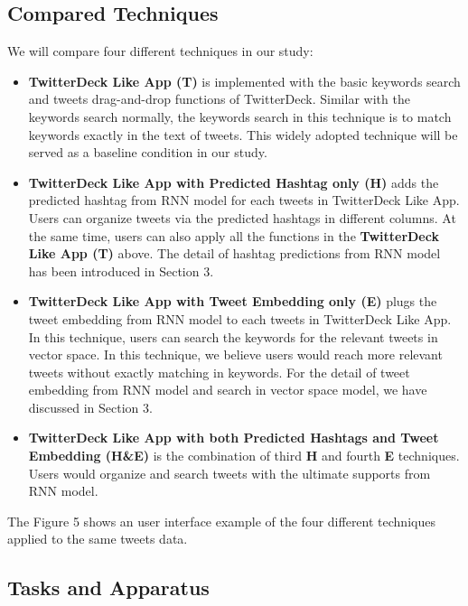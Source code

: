 \subsection{Compared Techniques}

We will compare four different techniques in our study:

\begin{itemize}
  \item \textbf{TwitterDeck Like App (T)} is implemented with the basic keywords search and tweets drag-and-drop functions of TwitterDeck. Similar with the keywords search normally, the keywords search in this technique is to match keywords exactly in the text of tweets. This widely adopted technique will be served as a baseline condition in our study. 
  
  \item \textbf{TwitterDeck Like App with Predicted Hashtag only (H)} adds the predicted hashtag from RNN model for each tweets in TwitterDeck Like App. Users can organize tweets via the predicted hashtags in different columns. At the same time, users can also apply all the functions in the \textbf{TwitterDeck Like App (T)} above. The detail of hashtag predictions from RNN model has been introduced in Section 3. 

  \item \textbf{TwitterDeck Like App with Tweet Embedding only (E)} plugs the tweet embedding from RNN model to each tweets in TwitterDeck Like App. In this technique, users can search the keywords for the relevant tweets in vector space. In this technique, we believe users would reach more relevant tweets without exactly matching in keywords. For the detail of tweet embedding from RNN model and search in vector space model, we have discussed in Section 3.   
  
  \item \textbf{TwitterDeck Like App with both Predicted Hashtags and Tweet Embedding (H\&E)} is the combination of third \textbf{H} and fourth \textbf{E} techniques. Users would organize and search tweets with the ultimate supports from RNN model. 
  
\end{itemize}

The Figure 5 shows an user interface example of the four different techniques applied to the same tweets data. 

\subsection{Tasks and Apparatus}

